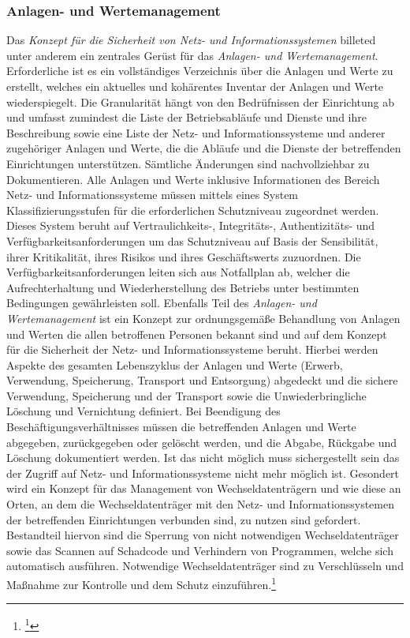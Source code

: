 \documentclass[11pt,a4paper,hidelinks]{article}   %
\begin{document}
            \subsubsection{Anlagen- und Wertemanagement}
            Das \emph{Konzept für die Sicherheit von Netz- und Informationssystemen} billeted unter anderem ein zentrales Gerüst für das \emph{Anlagen- und Wertemanagement}. Erforderliche ist es ein vollständiges Verzeichnis über die Anlagen und Werte zu erstellt, welches ein aktuelles und kohärentes Inventar der Anlagen und Werte wiederspiegelt. Die Granularität hängt von den Bedrüfnissen der Einrichtung ab und umfasst zumindest die Liste der Betriebsabläufe und Dienste und ihre Beschreibung sowie eine Liste der Netz- und Informationssysteme und anderer zugehöriger Anlagen und Werte, die die Abläufe und die Dienste der betreffenden Einrichtungen unterstützen. Sämtliche Änderungen sind nachvollziehbar zu Dokumentieren. Alle Anlagen und Werte inklusive Informationen des Bereich Netz- und Informationssysteme müssen mittels eines System Klassifizierungsstufen für die erforderlichen Schutzniveau zugeordnet werden. Dieses System beruht auf Vertraulichkeits-, Integritäts-, Authentizitäts- und Verfügbarkeitsanforderungen um das Schutzniveau auf Basis der Sensibilität, ihrer Kritikalität, ihres Risikos und ihres Geschäftswerts zuzuordnen. Die Verfügbarkeitsanforderungen leiten sich aus Notfallplan ab, welcher die Aufrechterhaltung und Wiederherstellung des Betriebs unter bestimmten Bedingungen gewährleisten soll. Ebenfalls Teil des \emph{Anlagen- und Wertemanagement} ist ein Konzept zur ordnungsgemäße Behandlung von Anlagen und Werten die allen betroffenen Personen bekannt sind und auf dem Konzept für die Sicherheit der Netz- und Informationssysteme beruht. Hierbei werden Aspekte des gesamten Lebenszyklus der Anlagen und Werte (Erwerb, Verwendung, Speicherung, Transport und Entsorgung) abgedeckt und die sichere Verwendung, Speicherung und der Transport sowie die Unwiederbringliche Löschung und Vernichtung definiert. Bei Beendigung des Beschäftigungsverhältnisses müssen die betreffenden Anlagen und Werte abgegeben, zurückgegeben oder gelöscht werden, und die Abgabe, Rückgabe und Löschung dokumentiert werden. Ist das nicht möglich muss sichergestellt sein das der Zugriff auf Netz- und Informationssysteme nicht mehr möglich ist. Gesondert wird ein Konzept für das Management von Wechseldatenträgern und wie diese an Orten, an dem die Wechseldatenträger mit den Netz- und Informationssystemen der betreffenden Einrichtungen verbunden sind, zu nutzen sind gefordert. Bestandteil hiervon sind die Sperrung von nicht notwendigen Wechseldatenträger sowie das Scannen auf Schadcode und Verhindern von Programmen, welche sich automatisch ausführen. Notwendige Wechseldatenträger sind zu Verschlüsseln und Maßnahme zur Kontrolle und dem Schutz einzuführen.\footnote{
                \footcite[Vgl.Nummer 12,][, Anhang]{EU2024-2690}
            }
\end{document}
